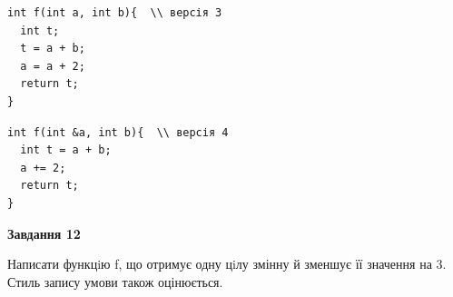\documentclass[12pt, ukrainian]{article}
\begin{document}
{\begin {large}
\begin{minipage}[t]{11.0cm}
\vspace{-8mm}\begin{verbatim}
int f(int a, int b){  \\ версія 3
  int t;
  t = a + b;
  a = a + 2;
  return t;
}
\end{verbatim}

\vspace{-8mm}\begin{verbatim}
int f(int &a, int b){  \\ версія 4
  int t = a + b;
  a += 2;
  return t;
}
\end{verbatim}



\begin{center}
\textbf{Завдання 12}
\end{center}

Написати функцiю f, що отримує одну цiлу змінну й зменшує її значення на 3. Стиль запису умови також оцінюється.\par

\end{minipage}

\end {large}}
\newpage
\end{document}
